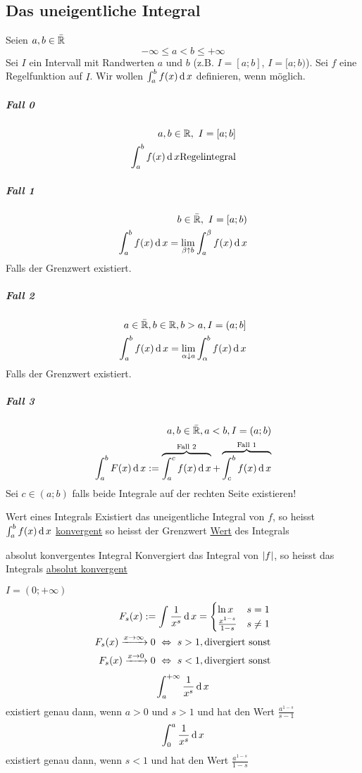 \subsection{Das uneigentliche Integral}
\begin{Sat}
  Seien $a,b\in\bar{\mathbb{R}}$
  \[-\infty\leq a<b\leq +\infty\]
  Sei $I$ ein Intervall mit Randwerten $a$ und $b$ (z.B. $I=[a;b]$, $I=[a;b)$). Sei $f$ eine Regelfunktion auf $I$. Wir wollen $\int^b_af(x)\operatorname{d} x$ definieren, wenn möglich.
  \subparagraph{Fall 0}
  \begin{align*}
    a,b\in\mathbb{R},\ I=[a;b]\\
    \int^b_af(x)\operatorname{d} x \text{Regelintegral}
  \end{align*}
  \subparagraph{Fall 1}
  \begin{align*}
    b\in\bar{\mathbb{R}},\ I=[a;b)\\
    \int^b_af(x)\operatorname{d} x=\lim_{\beta\uparrow b}\int^\beta_af(x)\operatorname{d} x
  \end{align*}
  Falls der Grenzwert existiert.
  \subparagraph{Fall 2}
  \begin{align*}
    a\in\bar{\mathbb{R}}, b\in \mathbb{R}, b>a, I=(a;b]\\
    \int^b_af(x)\operatorname{d} x=\lim_{\alpha\downarrow a}\int^b_\alpha f(x)\operatorname{d} x
  \end{align*}
  Falls der Grenzwert existiert.
  \subparagraph{Fall 3}
  \begin{align*}
    a,b\in\bar{\mathbb{R}}, a<b, I=(a;b)\\
    \int^b_aF(x)\operatorname{d} x:=\overbrace{\int^c_af(x)\operatorname{d} x}^\text{Fall 2} + \overbrace{\int^b_cf(x)\operatorname{d} x}^\text{Fall 1}\\
  \end{align*}
  Sei $c\in(a;b)$ falls beide Integrale auf der rechten Seite existieren!
\end{Sat}
\begin{Def}{Wert eines Integrals}
  Existiert das uneigentliche Integral von $f$, so heisst $\int^b_af(x)\operatorname{d} x$ \underline{konvergent} so heisst der Grenzwert \underline{Wert} des Integrals
\end{Def}
\begin{Def}{absolut konvergentes Integral}
  Konvergiert das Integral von $\left| f \right|$, so heisst das Integrals \underline{absolut konvergent}
\end{Def}
\begin{Bsp}
  $I=(0;+\infty)$
  \begin{align*}
    F_s(x):=\int\frac{1}{x^s}\operatorname{d} x=\begin{cases}
      \ln x& s=1\\
      \frac{x^{1-s}}{1-s}&s\neq 1
    \end{cases}\\
    F_s(x)\xrightarrow{x\to\infty}0\ \Leftrightarrow\ s>1, \text{divergiert sonst}\\
    F_s(x)\xrightarrow{x\to0}0\ \Leftrightarrow\ s<1, \text{divergiert sonst}\\
  \end{align*}
  \[\int_a^{+\infty}\frac{1}{x^s}\operatorname{d} x\]
  existiert genau dann, wenn $a>0$ und $s>1$ und hat den Wert $\frac{a^{1-s}}{s-1}$
  \[\int_0^a\frac{1}{x^s}\operatorname{d} x\]
  existiert genau dann, wenn $s<1$ und hat den Wert $\frac{a^{1-s}}{1-s}$
\end{Bsp}
